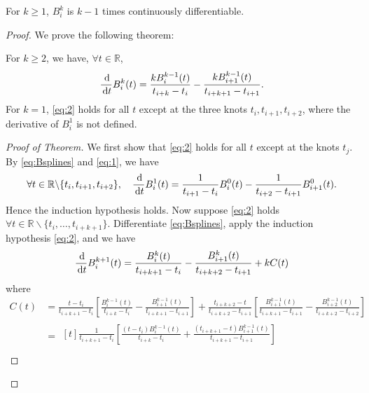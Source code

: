 \begin{sol}
  \begin{prop}
    \label{prop:4}
    For $k\ge 1$, $B_i^k$ is $k-1$ times continuously differentiable.
  \end{prop}
  \begin{proof}
    We prove the following theorem:
    \begin{thm}
      For $k\ge 2$, we have,
      $\forall t\in\mathbb{R}$,
      \begin{equation}
        \label{eq:2}
        \frac{\,\mathrm{d}}{\,\mathrm{d} t}B_i^k(t) = \frac{kB_i^{k-1}(t)}{t_{i+k}-t_i} -
        \frac{kB_{i+1}^{k-1}(t)}{t_{i+k+1}-t_{i+1}}.
      \end{equation}
      For $k=1$, \eqref{eq:2} holds for all $t$ except at the three knots
      $t_i, t_{i+1}, t_{i+2}$,
      where the derivative of $B_i^1$ is not defined.
    \end{thm}
    \begin{proof}[Proof of Theorem]
      We first show that \eqref{eq:2} holds for all $t$ except at the knots $t_j$.
      By \eqref{eq:Bsplines} and \eqref{eq:1}, we have
      \begin{displaymath}
        \forall t\in\mathbb{R}\backslash\{t_i, t_{i+1}, t_{i+2}\},\quad
        \frac{\,\mathrm{d}}{\,\mathrm{d} t}B_i^1(t) = \frac{1}{t_{i+1}-t_i}B_i^0(t)
        - \frac{1}{t_{i+2}-t_{i+1}}B_{i+1}^0(t).
      \end{displaymath}
      Hence the induction hypothesis holds.
      Now suppose \eqref{eq:2} holds $\forall t\in\mathbb{R}\backslash
      \{t_i, \ldots, t_{i+k+1}\}$.
      Differentiate \eqref{eq:Bsplines},
      apply the induction hypothesis \eqref{eq:2},
      and we have
      \begin{equation}
        \label{eq:3}
        \frac{\,\mathrm{d}}{\,\mathrm{d} t}B_i^{k+1}(t) = \frac{B_i^k(t)}{t_{i+k+1}-t_i} -
\frac{B_{i+1}^k(t)}{t_{i+k+2}-t_{i+1}} + kC(t)
\end{equation}
where
\begin{align*}
  C(t) &= \frac{t-t_i}{t_{i+k+1}-t_i}\left[\frac{B_i^{k-1}(t)}{t_{i+k}-t_i}
  - \frac{B_{i+1}^{k-1}(t)}{t_{i+k+1}-t_{i+1}}\right] +
  \frac{t_{i+k+2}-t}{t_{i+k+2}-t_{i+1}}\left[\frac{B_{i+1}^{k-1}(t)}{t_{i+k+1}-t_{i+1}}
         - \frac{B_{i+2}^{k-1}(t)}{t_{i+k+2}-t_{i+2}}\right] \\
       &=\begin{multlined}[t]
         \frac{1}{t_{i+k+1}-t_i}\left[\frac{(t-t_i)B_i^{k-1}(t)}{t_{i+k}-t_i}
           +
           \frac{(t_{i+k+1}-t)B_{i+1}^{k-1}(t)}{t_{i+k+1}-t_{i+1}}\right] \\

\end{multlined}
\end{align*}
\end{proof}
\end{proof}
\end{sol}
